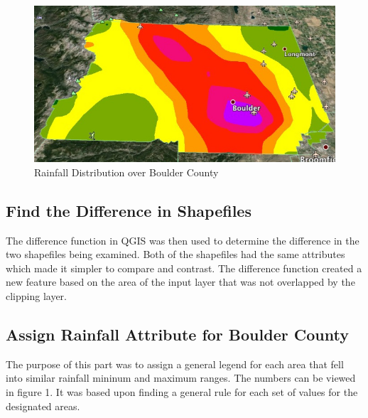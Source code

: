 \documentclass[twoside]{article}
\begin{document}
\begin{multicols}{2}
\begin{figure}[!h] %
\includegraphics[width=2\columnwidth]{earth.jpg}
\caption{Rainfall Distribution over Boulder County\label{fig:earth}}
\end{figure}

\subsection{Find the Difference in Shapefiles}
The difference function in QGIS was then used to determine the difference in the two shapefiles being examined. Both of the shapefiles had the same attributes which made it simpler to compare and contrast. The difference function created a new feature based on the area of the input layer that was not overlapped by the clipping layer.



\subsection{Assign Rainfall Attribute for Boulder County}
The purpose of this part was to assign a general legend for each area that fell into similar rainfall mininum and maximum ranges. The numbers can be viewed in figure 1. It was based upon finding a general rule for each set of values for the designated areas. 



\end{multicols}
\end{document}
